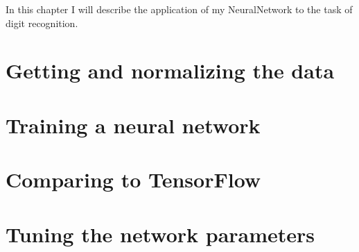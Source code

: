 In this chapter I will describe the application of my NeuralNetwork to the task of digit recognition.

\section{Getting and normalizing the data}


\section{Training a neural network}

\section{Comparing to TensorFlow}


\section{Tuning the network parameters}

